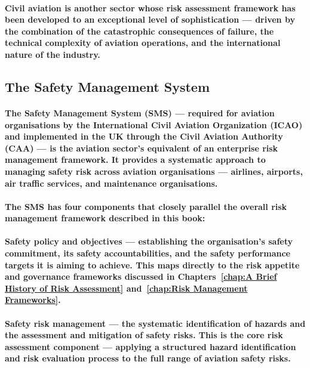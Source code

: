 \paragraph{Civil aviation is another sector whose risk assessment framework has been developed to an exceptional level of sophistication — driven by the combination of the catastrophic consequences of failure, the technical complexity of aviation operations, and the international nature of the industry.}

\subsection{The Safety Management System}
\paragraph{The \textbf{Safety Management System (SMS)} — required for aviation organisations by the \textbf{International Civil Aviation Organization (ICAO)} and implemented in the UK through the \textbf{Civil Aviation Authority (CAA)} — is the aviation sector's equivalent of an enterprise risk management framework. It provides a systematic approach to managing safety risk across aviation organisations — airlines, airports, air traffic services, and maintenance organisations.}
\paragraph{The SMS has four components that closely parallel the overall risk management framework described in this book:}
\paragraph{Safety policy and objectives — establishing the organisation's safety commitment, its safety accountabilities, and the safety performance targets it is aiming to achieve. This maps directly to the risk appetite and governance frameworks discussed in Chapters~\ref{chap:A Brief History of Risk Assessment} and~\ref{chap:Risk Management Frameworks}.}
\paragraph{\textbf{Safety risk management} — the systematic identification of hazards and the assessment and mitigation of safety risks. This is the core risk assessment component — applying a structured hazard identification and risk evaluation process to the full range of aviation safety risks.}
